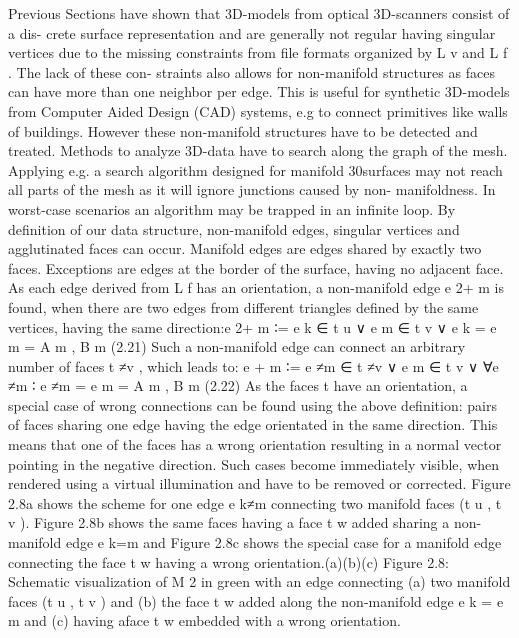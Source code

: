 \documentclass[openany]{book}
\begin{document}
Previous Sections have shown that 3D-models from optical 3D-scanners consist of a dis-
crete surface representation and are generally not regular having singular vertices due to
the missing constraints from file formats organized by L v and L f . The lack of these con-
straints also allows for non-manifold structures as faces can have more than one neighbor
per edge. This is useful for synthetic 3D-models from Computer Aided Design (CAD)
systems, e.g to connect primitives like walls of buildings. However these non-manifold
structures have to be detected and treated. Methods to analyze 3D-data have to search
along the graph of the mesh. Applying e.g. a search algorithm designed for manifold
30surfaces may not reach all parts of the mesh as it will ignore junctions caused by non-
manifoldness. In worst-case scenarios an algorithm may be trapped in an infinite loop. By
definition of our data structure, non-manifold edges, singular vertices and agglutinated
faces can occur.
Manifold edges are edges shared by exactly two faces. Exceptions are edges at the
border of the surface, having no adjacent face. As each edge derived from L f has an
orientation, a non-manifold edge e 2+
m is found, when there are two edges from different
triangles defined by the same vertices, having the same direction:e 2+
m ∶= e k ∈ t u ∨ e m ∈ t v ∨ e k = e m = {A m , B m }(2.21)
Such a non-manifold edge can connect an arbitrary number of faces t ≠v , which leads to:
e + m ∶= e ≠m ∈ t ≠v ∨ e m ∈ t v ∨ ∀e ≠m ∶ e ≠m = e m = {A m , B m }(2.22)
As the faces t have an orientation, a special case of wrong connections can be found
using the above definition: pairs of faces sharing one edge having the edge orientated in
the same direction. This means that one of the faces has a wrong orientation resulting
in a normal vector pointing in the negative direction. Such cases become immediately
visible, when rendered using a virtual illumination and have to be removed or corrected.
Figure 2.8a shows the scheme for one edge e k≠m connecting two manifold faces (t u , t v ).
Figure 2.8b shows the same faces having a face t w added sharing a non-manifold edge
e k=m and Figure 2.8c shows the special case for a manifold edge connecting the face t w
having a wrong orientation.(a)(b)(c)
Figure 2.8: Schematic visualization of M 2 in green with an edge connecting (a) two manifold
faces (t u , t v ) and (b) the face t w added along the non-manifold edge e k = e m and 
(c) having aface t w embedded with a wrong orientation.~\cite[p.~30-31]{Mara12}
\end{document}
